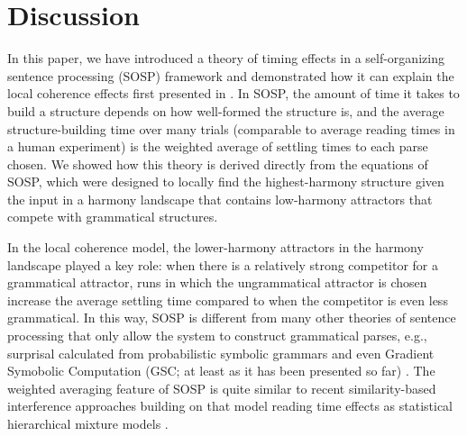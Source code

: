 \documentclass[10pt,letterpaper]{article}
\begin{document}
\section{Discussion}
In this paper, we have introduced a theory of timing effects in a self-organizing sentence processing (SOSP) framework and demonstrated how it can explain the local coherence effects first presented in \cite{tabor2004effects}. In SOSP, the amount of time it takes to build a structure depends on how well-formed the structure is, and the average structure-building time over many trials (comparable to average reading times in a human experiment) is the weighted average of settling times to each parse chosen. We showed how this theory is derived directly from the equations of SOSP, which were designed to locally find the highest-harmony structure given the input in a harmony landscape that contains low-harmony attractors that compete with grammatical structures.

In the local coherence model, the lower-harmony attractors in the harmony landscape played a key role: when there is a relatively strong competitor for a grammatical attractor, runs in which the ungrammatical attractor is chosen increase the average settling time compared to when the competitor is even less grammatical. In this way, SOSP is different from many other theories of sentence processing that only allow the system to construct grammatical parses, e.g., surprisal calculated from probabilistic symbolic grammars \cite{levy2008expectation, hale2001probabilistic} and even Gradient Symobolic Computation (GSC; at least as it has been presented so far) \cite{cho2016bifurcation, cho2017incremental, cho2018dynamic}. The weighted averaging feature of SOSP is quite similar to recent similarity-based interference approaches building on  that model reading time effects as statistical hierarchical mixture models \cite{nicenboim2018models, vasishth2017feature}.
\end{document}

